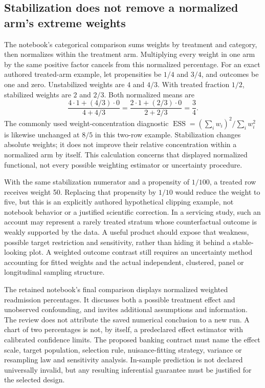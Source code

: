 \subsection{Stabilization does not remove a normalized arm's extreme weights}
The notebook's categorical comparison sums weights by treatment and category,
then normalizes within the treatment arm. Multiplying every weight in one arm
by the same positive factor cancels from this normalized percentage. For an
exact authored treated-arm example, let propensities be $1/4$ and $3/4$, and
outcomes be one and zero. Unstabilized weights are $4$ and $4/3$. With treated
fraction $1/2$, stabilized weights are $2$ and $2/3$. Both normalized means are
\begin{equation}
 \frac{4\cdot1+(4/3)\cdot0}{4+4/3}
 =\frac{2\cdot1+(2/3)\cdot0}{2+2/3}=\frac34.
\end{equation}
The commonly used weight-concentration diagnostic
$\operatorname{ESS}=(\sum_i w_i)^2/\sum_i w_i^2$ is likewise unchanged at
$8/5$ in this two-row example. Stabilization changes absolute weights; it does
not improve their relative concentration within a normalized arm by itself.
This calculation concerns that displayed normalized functional, not every
possible weighting estimator or uncertainty procedure.~\citep{exec25_datarobot_notebook,exec25_datarobot_choice}

With the same stabilization numerator and a propensity of $1/100$, a treated
row receives weight 50. Replacing that propensity by $1/10$ would reduce the
weight to five, but this is an explicitly authored hypothetical clipping
example, not notebook behavior or a justified scientific correction. In a
servicing study, such an account may represent a rarely treated stratum whose
counterfactual outcome is weakly supported by the data. A useful product
should expose that weakness, possible target restriction and sensitivity,
rather than hiding it behind a stable-looking plot. A weighted outcome contrast
still requires an uncertainty method accounting for fitted weights and the
actual independent, clustered, panel or longitudinal sampling structure.
\citep{exec25_datarobot_choice}

The retained notebook's final comparison displays normalized weighted
readmission percentages. It discusses both a possible treatment effect and
unobserved confounding, and invites additional assumptions and information.
The review does not attribute the saved numerical conclusion to a new run.
A chart of two percentages is not, by itself, a predeclared effect estimator
with calibrated confidence limits. The proposed banking contract must name
the effect scale, target population, selection rule, nuisance-fitting strategy,
variance or resampling law and sensitivity analysis. In-sample prediction is
not declared universally invalid, but any resulting inferential guarantee must
be justified for the selected design.~\citep{exec25_datarobot_notebook,exec25_datarobot_choice}

